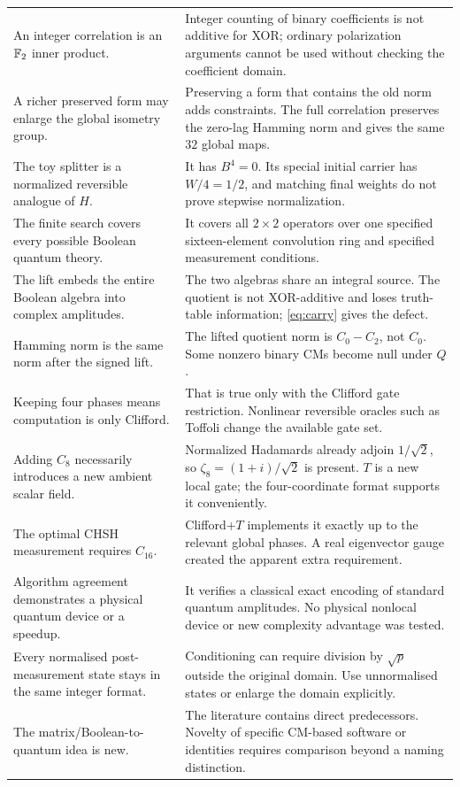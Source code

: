 \begin{longtable}{@{}L{0.31\textwidth}L{0.62\textwidth}@{}}
An integer correlation is an $\mathbb F_2$ inner product. & Integer counting of binary coefficients is not additive for XOR; ordinary polarization arguments cannot be used without checking the coefficient domain.\\
A richer preserved form may enlarge the global isometry group. & Preserving a form that contains the old norm adds constraints. The full correlation preserves the zero-lag Hamming norm and gives the same $32$ global maps.\\
The toy splitter is a normalized reversible analogue of $H$. & It has $B^4=0$. Its special initial carrier has $W/4=1/2$, and matching final weights do not prove stepwise normalization.\\
The finite search covers every possible Boolean quantum theory. & It covers all $2\times2$ operators over one specified sixteen-element convolution ring and specified measurement conditions.\\
The lift embeds the entire Boolean algebra into complex amplitudes. & The two algebras share an integral source. The quotient is not XOR-additive and loses truth-table information; \cref{eq:carry} gives the defect.\\
Hamming norm is the same norm after the signed lift. & The lifted quotient norm is $C_0-C_2$, not $C_0$. Some nonzero binary CMs become null under $Q$.\\
Keeping four phases means computation is only Clifford. & That is true only with the Clifford gate restriction. Nonlinear reversible oracles such as Toffoli change the available gate set.\\
Adding $C_8$ necessarily introduces a new ambient scalar field. & Normalized Hadamards already adjoin $1/\sqrt2$, so $\zeta_8=(1+i)/\sqrt2$ is present. $T$ is a new local gate; the four-coordinate format supports it conveniently.\\
The optimal CHSH measurement requires $C_{16}$. & Clifford+$T$ implements it exactly up to the relevant global phases. A real eigenvector gauge created the apparent extra requirement.\\
Algorithm agreement demonstrates a physical quantum device or a speedup. & It verifies a classical exact encoding of standard quantum amplitudes. No physical nonlocal device or new complexity advantage was tested.\\
Every normalised post-measurement state stays in the same integer format. & Conditioning can require division by $\sqrt p$ outside the original domain. Use unnormalised states or enlarge the domain explicitly.\\
The matrix/Boolean-to-quantum idea is new. & The literature contains direct predecessors. Novelty of specific CM-based software or identities requires comparison beyond a naming distinction.\\
\bottomrule
\end{longtable}
\endgroup

